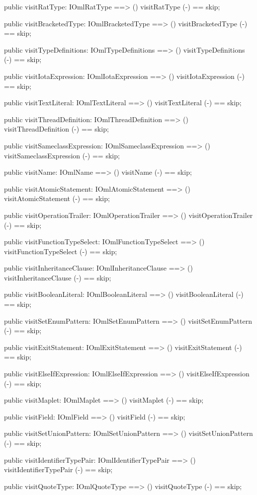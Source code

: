 \begin{vdm_al}
  public visitRatType: IOmlRatType ==> ()
  visitRatType (-) == skip;

  public visitBracketedType: IOmlBracketedType ==> ()
  visitBracketedType (-) == skip;

  public visitTypeDefinitions: IOmlTypeDefinitions ==> ()
  visitTypeDefinitions (-) == skip;

  public visitIotaExpression: IOmlIotaExpression ==> ()
  visitIotaExpression (-) == skip;

  public visitTextLiteral: IOmlTextLiteral ==> ()
  visitTextLiteral (-) == skip;

  public visitThreadDefinition: IOmlThreadDefinition ==> ()
  visitThreadDefinition (-) == skip;

  public visitSameclassExpression: IOmlSameclassExpression ==> ()
  visitSameclassExpression (-) == skip;

  public visitName: IOmlName ==> ()
  visitName (-) == skip;

  public visitAtomicStatement: IOmlAtomicStatement ==> ()
  visitAtomicStatement (-) == skip;

  public visitOperationTrailer: IOmlOperationTrailer ==> ()
  visitOperationTrailer (-) == skip;

  public visitFunctionTypeSelect: IOmlFunctionTypeSelect ==> ()
  visitFunctionTypeSelect (-) == skip;

  public visitInheritanceClause: IOmlInheritanceClause ==> ()
  visitInheritanceClause (-) == skip;

  public visitBooleanLiteral: IOmlBooleanLiteral ==> ()
  visitBooleanLiteral (-) == skip;

  public visitSetEnumPattern: IOmlSetEnumPattern ==> ()
  visitSetEnumPattern (-) == skip;

  public visitExitStatement: IOmlExitStatement ==> ()
  visitExitStatement (-) == skip;

  public visitElseIfExpression: IOmlElseIfExpression ==> ()
  visitElseIfExpression (-) == skip;

  public visitMaplet: IOmlMaplet ==> ()
  visitMaplet (-) == skip;

  public visitField: IOmlField ==> ()
  visitField (-) == skip;

  public visitSetUnionPattern: IOmlSetUnionPattern ==> ()
  visitSetUnionPattern (-) == skip;

  public visitIdentifierTypePair: IOmlIdentifierTypePair ==> ()
  visitIdentifierTypePair (-) == skip;

  public visitQuoteType: IOmlQuoteType ==> ()
  visitQuoteType (-) == skip;


\end{vdm_al}
